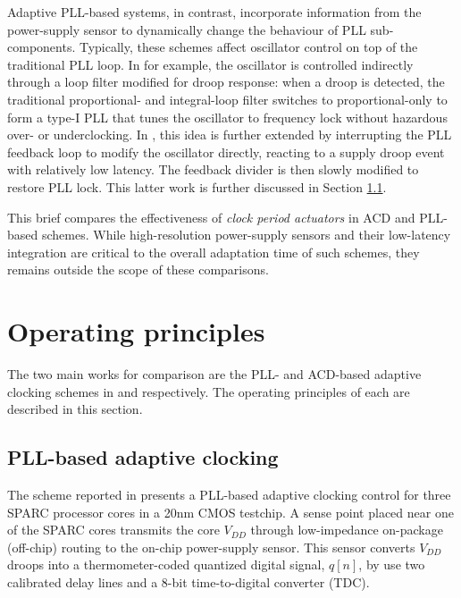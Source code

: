 \documentclass[twoside,9pt,journal,letterpage]{IEEEtran}
\begin{document}
Adaptive PLL-based systems, in contrast, incorporate information from the power-supply sensor to dynamically change the behaviour of PLL sub-components. Typically, these schemes affect oscillator control on top of the traditional PLL loop. In \cite{ahmad2017} for example, the oscillator is controlled indirectly through a loop filter modified for droop response: when a droop is detected, the traditional proportional- and integral-loop filter switches to proportional-only to form a type-I PLL that tunes the oscillator to frequency lock without hazardous over- or underclocking. In \cite{hashimoto2018}, this idea is further extended by interrupting the PLL feedback loop to modify the oscillator directly, reacting to a supply droop event with relatively low latency. The feedback divider is then slowly modified to restore PLL lock. This latter work is further discussed in Section \ref{sec:details_pll}.

This brief compares the effectiveness of \textit{clock period actuators} in ACD and PLL-based schemes. While high-resolution power-supply sensors and their low-latency integration are critical to the overall adaptation time of such schemes, they remains outside the scope of these comparisons.

\vspace{-10pt}
\section{Operating principles}
\label{sec:details}
The two main works for comparison are the PLL- and ACD-based adaptive clocking schemes in \cite{hashimoto2018} and \cite{wilcox2015} respectively. The operating principles of each are described in this section.

\vspace{-10pt}
\subsection{PLL-based adaptive clocking}
\label{sec:details_pll}
The scheme reported in \cite{hashimoto2018} presents a PLL-based adaptive clocking control for three SPARC processor cores in a 20nm CMOS testchip. A sense point placed near one of the SPARC cores transmits the core $V_{DD}$ through low-impedance on-package (off-chip) routing to the on-chip power-supply sensor. This sensor converts $V_{DD}$ droops into a thermometer-coded quantized digital signal, $q[n]$, by use two calibrated delay lines and a 8-bit time-to-digital converter (TDC). 
\end{document}
